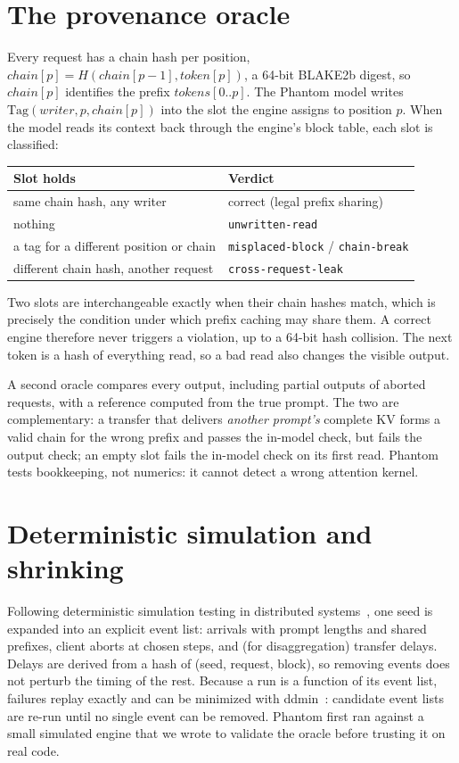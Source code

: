 \documentclass[10pt]{article}
\newcommand{\code}[1]{\texttt{\small #1}}
\begin{document}
\section{The provenance oracle}\label{sec:oracle}
Every request has a chain hash per position,
$\mathit{chain}[p] = H(\mathit{chain}[p-1], \mathit{token}[p])$, a 64-bit
BLAKE2b digest, so $\mathit{chain}[p]$ identifies the prefix
$\mathit{tokens}[0..p]$. The Phantom model writes
$\mathrm{Tag}(\mathit{writer}, p, \mathit{chain}[p])$ into the slot the
engine assigns to position $p$. When the model reads its context back
through the engine's block table, each slot is classified:
\begin{center}
\begin{tabular}{ll}
\toprule
Slot holds & Verdict \\
\midrule
same chain hash, any writer & correct (legal prefix sharing) \\
nothing & \code{unwritten-read} \\
a tag for a different position or chain & \code{misplaced-block} / \code{chain-break} \\
different chain hash, another request & \code{cross-request-leak} \\
\bottomrule
\end{tabular}
\end{center}
Two slots are interchangeable exactly when their chain hashes match, which
is precisely the condition under which prefix caching may share them. A
correct engine therefore never triggers a violation, up to a 64-bit hash
collision. The next token is a hash of everything read, so a bad read also
changes the visible output.

A second oracle compares every output, including partial outputs of aborted
requests, with a reference computed from the true prompt. The two are
complementary: a transfer that delivers \emph{another prompt's} complete KV
forms a valid chain for the wrong prefix and passes the in-model check, but
fails the output check; an empty slot fails the in-model check on its first
read. Phantom tests bookkeeping, not numerics: it cannot detect a wrong
attention kernel.

\section{Deterministic simulation and shrinking}\label{sec:dst}
Following deterministic simulation testing in distributed
systems~\cite{zhou2021fdb}, one seed is expanded into an explicit event
list: arrivals with prompt lengths and shared prefixes, client aborts at
chosen steps, and (for disaggregation) transfer delays. Delays are derived
from a hash of (seed, request, block), so removing events does not perturb
the timing of the rest. Because a run is a function of its event list,
failures replay exactly and can be minimized with ddmin~\cite{zeller2002ddmin}:
candidate event lists are re-run until no single event can be removed.
Phantom first ran against a small simulated engine that we wrote to
validate the oracle before trusting it on real code.
\end{document}
